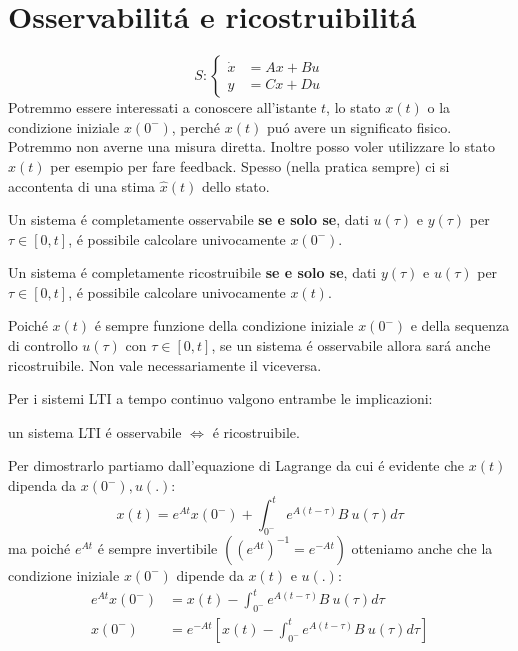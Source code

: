 \documentclass[../main.tex]{subfiles}
\begin{document}
	\section{Osservabilit\'a e ricostruibilit\'a}
		\[
			S:
			\begin{cases}
				\dot x &= Ax + Bu\\
				y &= Cx + Du
			\end{cases}
		\]
		Potremmo essere interessati a conoscere all'istante $ t $, lo stato $ x(t) $ o la condizione iniziale $ x(0^{-}) $, perch\'e $ x(t) $ pu\'o avere un significato fisico. Potremmo non averne una misura diretta. Inoltre posso voler utilizzare lo stato $ x(t) $ per esempio per fare feedback. Spesso (nella pratica sempre) ci si accontenta di una stima $ \hat x(t) $ dello stato.
		
		\begin{definition}
			Un sistema \'e completamente osservabile \textbf{se e solo se}, dati $ u(\tau) $ e $ y(\tau) $ per $ \tau \in [0,t] $, \'e possibile calcolare univocamente $ x(0^{-}) $.
		\end{definition}
	
		\begin{definition}
			Un sistema \'e completamente ricostruibile \textbf{se e solo se}, dati $ y(\tau) $ e $ u(\tau) $ per $ \tau \in [0,t] $, \'e possibile calcolare univocamente $ x(t) $.
		\end{definition}
	
		Poich\'e $ x(t) $ \'e sempre funzione della condizione iniziale $ x(0^{-}) $ e della sequenza di controllo $ u(\tau) $ con $ \tau \in [0,t] $, se un sistema \'e osservabile allora sar\'a anche ricostruibile. Non vale necessariamente il viceversa.
		
		Per i sistemi LTI a tempo continuo valgono entrambe le implicazioni:
		\begin{center}
			un sistema LTI \'e osservabile $ \Leftrightarrow $ \'e ricostruibile.
		\end{center}
		Per dimostrarlo partiamo dall'equazione di Lagrange da cui \'e evidente che $ x(t) $ dipenda da $ x(0^{-}), u(.) $:
		\[
			x(t) = e^{At}x(0^{-}) + \int_{0^{-}}^{t} e^{A(t-\tau)} B\ u(\tau) d\tau
		\]
		ma poich\'e $ e^{At} $ \'e sempre invertibile $ \left( (e^{At})^{-1} = e^{-At} \right) $ otteniamo anche che la condizione iniziale $ x(0^{-}) $ dipende da $ x(t) $ e $ u(.) $:
		\begin{align*}
			e^{At} x(0^{-}) &= x(t) - \int_{0^{-}}^{t} e^{A(t-\tau)} B\ u(\tau) d\tau\\
			x(0^{-}) &= e^{-At} \left[ x(t) - \int_{0^{-}}^{t} e^{A(t-\tau)} B\ u(\tau) d\tau \right] 
		\end{align*}
		
\end{document}
